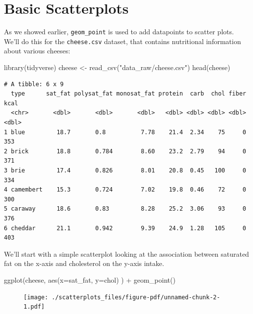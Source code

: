 \documentclass[
  letterpaper,
  DIV=11,
  numbers=noendperiod]{scrreprt}
\newenvironment{Shaded}{\begin{snugshade}}{\end{snugshade}}
\newcommand{\AttributeTok}[1]{\textcolor[rgb]{0.40,0.45,0.13}{#1}}
\newcommand{\FunctionTok}[1]{\textcolor[rgb]{0.28,0.35,0.67}{#1}}
\newcommand{\NormalTok}[1]{\textcolor[rgb]{0.00,0.23,0.31}{#1}}
\newcommand{\OtherTok}[1]{\textcolor[rgb]{0.00,0.23,0.31}{#1}}
\newcommand{\SpecialCharTok}[1]{\textcolor[rgb]{0.37,0.37,0.37}{#1}}
\newcommand{\StringTok}[1]{\textcolor[rgb]{0.13,0.47,0.30}{#1}}
\begin{document}
\hypertarget{basic-scatterplots}{%
\section{Basic Scatterplots}\label{basic-scatterplots}}

As we showed earlier, \texttt{geom\_point} is used to add datapoints to
scatter plots. We'll do this for the \texttt{cheese.csv} dataset, that
contains nutritional information about various cheeses:

\begin{Shaded}
\begin{Highlighting}[]
\FunctionTok{library}\NormalTok{(tidyverse)}
\NormalTok{cheese }\OtherTok{\textless{}{-}} \FunctionTok{read\_csv}\NormalTok{(}\StringTok{"data\_raw/cheese.csv"}\NormalTok{)}
\FunctionTok{head}\NormalTok{(cheese)}
\end{Highlighting}
\end{Shaded}

\begin{verbatim}
# A tibble: 6 x 9
  type      sat_fat polysat_fat monosat_fat protein  carb  chol fiber  kcal
  <chr>       <dbl>       <dbl>       <dbl>   <dbl> <dbl> <dbl> <dbl> <dbl>
1 blue         18.7       0.8          7.78    21.4  2.34    75     0   353
2 brick        18.8       0.784        8.60    23.2  2.79    94     0   371
3 brie         17.4       0.826        8.01    20.8  0.45   100     0   334
4 camembert    15.3       0.724        7.02    19.8  0.46    72     0   300
5 caraway      18.6       0.83         8.28    25.2  3.06    93     0   376
6 cheddar      21.1       0.942        9.39    24.9  1.28   105     0   403
\end{verbatim}

We'll start with a simple scatterplot looking at the association between
saturated fat on the x-axis and cholesterol on the y-axis intake.

\begin{Shaded}
\begin{Highlighting}[]
\FunctionTok{ggplot}\NormalTok{(cheese, }\FunctionTok{aes}\NormalTok{(}\AttributeTok{x=}\NormalTok{sat\_fat, }\AttributeTok{y=}\NormalTok{chol) ) }\SpecialCharTok{+} 
  \FunctionTok{geom\_point}\NormalTok{()}
\end{Highlighting}
\end{Shaded}

\begin{figure}[H]

{\centering \texttt{[image: ./scatterplots\_files/figure-pdf/unnamed-chunk-2-1.pdf]}

}

\end{figure}
\end{document}
